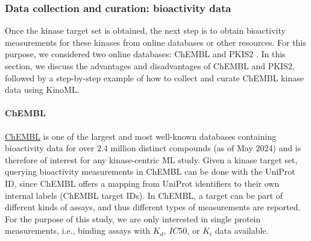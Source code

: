 \documentclass[9pt,lessons]{livecoms}
\begin{document}


\subsubsection{Data collection and curation: bioactivity data}

Once the kinase target set is obtained, the next step is to obtain bioactivity measurements for these kinases from online databases or other resources. 
For this purpose, we considered two online databases: ChEMBL \cite{zdrazil2023chembl} and PKIS2 \cite{drewry2017progress}. 
In this section, we discuss the advantages and disadvantages of ChEMBL and PKIS2, followed by a step-by-step example of how to collect and curate ChEMBL kinase data using KinoML.


\paragraph{ChEMBL}
\href{https://www.ebi.ac.uk/chembl/}{ChEMBL} \cite{zdrazil2023chembl} is one of the largest and most well-known databases containing bioactivity data for over $2.4$ million distinct compounds (as of May 2024) and is therefore of interest for any kinase-centric ML study. Given a kinase target set, querying bioactivity measurements in ChEMBL can be done with the UniProt ID, since ChEMBL offers a mapping from UniProt identifiers to their own internal labels (ChEMBL target IDs). 
In ChEMBL, a target can be part of different kinds of assays, and thus different types of measurements are reported.
For the purpose of this study, we are only interested in single protein measurements, i.e., binding assays with $K_d$, $IC50$, or $K_i$ data available.
\end{document}
